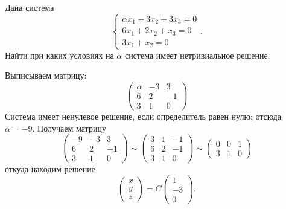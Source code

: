 \begin{task}
    Дана система 
    \begin{equation*}
        \begin{cases}
            \alpha x_1 -3x_2 + 3x_3 = 0\\
            6x_1 + 2x_2 + x_3 = 0\\
            3x_1 + x_2 = 0
        \end{cases}.
    \end{equation*}
    Найти при каких условиях на $\alpha$ система имеет нетривиальное решение.
\end{task}

Выписываем матрицу:
\begin{equation*}
    \begin{pmatrix}
        \alpha & -3 & 3 \\ 6 & 2 & -1 \\ 3 & 1 & 0
    \end{pmatrix}
\end{equation*}
Система имеет ненулевое решение, если определитель равен нулю; отсюда $\alpha = -9$. Получаем матрицу
\begin{equation*}
    \begin{pmatrix}
        -9 & -3 & 3 \\ 6 & 2 & -1 \\ 3 & 1 & 0
    \end{pmatrix} \sim \begin{pmatrix}
        3 & 1 & -1 \\ 6 & 2 & -1 \\ 3 & 1 & 0
    \end{pmatrix} \sim \begin{pmatrix}
        0 & 0 & 1 \\ \hline 3 & 1 & 0
    \end{pmatrix}
\end{equation*}
откуда находим решение
\begin{equation*}
    \begin{pmatrix}
        x \\ y \\ z
    \end{pmatrix} = C\begin{pmatrix}
        1 \\ -3 \\ 0
    \end{pmatrix}.
\end{equation*}

